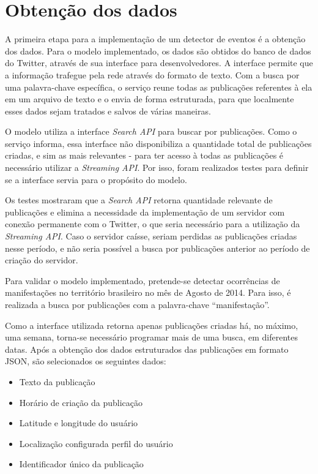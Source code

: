 \section{Obtenção dos dados}

A primeira etapa para a implementação de um detector de eventos é a obtenção dos dados. Para o modelo implementado, os dados são obtidos do banco de dados do Twitter, através de sua interface para desenvolvedores. A interface permite que a informação trafegue pela rede através do formato de texto. Com a busca por uma palavra-chave específica, o serviço reune todas as publicações referentes à ela em um arquivo de texto e o envia de forma estruturada, para que localmente esses dados sejam tratados e salvos de várias maneiras.

O modelo utiliza a interface \textit{Search API} para buscar por publicações. Como o serviço informa, essa interface não disponibiliza a quantidade total de publicações criadas, e sim as mais relevantes - para ter acesso à todas as publicações é necessário utilizar a \textit{Streaming API}. Por isso, foram realizados testes para definir se a interface servia para o propósito do modelo. 

Os testes mostraram que a \textit{Search API} retorna quantidade relevante de publicações e elimina a necessidade da implementação de um servidor com conexão permanente com o Twitter, o que seria necessário para a utilização da \textit{Streaming API}. Caso o servidor caísse, seriam perdidas as publicações criadas nesse período, e não seria possível a busca por publicações anterior ao período de criação do servidor.

Para validar o modelo implementado, pretende-se detectar ocorrências de manifestações no território brasileiro no mês de Agosto de 2014. Para isso, é realizada a busca por publicações com a palavra-chave ``manifestação''. 

Como a interface utilizada retorna apenas publicações criadas há, no máximo, uma semana, torna-se necessário programar mais de uma busca, em diferentes datas. Após a obtenção dos dados estruturados das publicações em formato JSON, são selecionados os seguintes dados: 

\begin{itemize}
	\item Texto da publicação
	\item Horário de criação da publicação
	\item Latitude e longitude do usuário
	\item Localização configurada perfil do usuário
	\item Identificador único da publicação
\end{itemize}

